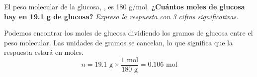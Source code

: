 El peso molecular de la glucosa, , es 180 g/mol.
\textbf{¿Cuántos moles de glucosa hay en 19.1 g de glucosa?}
\emph{Expresa la respuesta con 3 cifras significativas.}

\begin{solutionbox}{4cm}
    Podemos encontrar los moles de glucosa dividiendo los gramos de glucosa entre el peso molecular. Las unidades de gramos se cancelan, lo que significa que la respuesta estará en moles.
    \[ n =  19.1 \text{ g} \times \frac{1 \text{ mol}}{180 \text{ g}} = 0.106 \text{ mol} \]
\end{solutionbox}